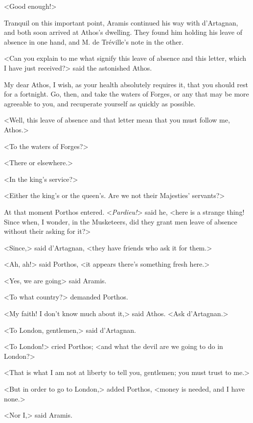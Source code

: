 <Good enough!> 

Tranquil on this important point, Aramis continued his way with d'Artagnan, and both soon arrived at Athos's dwelling. They found him holding his leave of absence in one hand, and M. de Tréville's note in the other. 

<Can you explain to me what signify this leave of absence and this letter, which I have just received?> said the astonished Athos. 

\begin{mail}{}{My dear Athos,}
I wish, as your health absolutely requires it, that you should rest for a fortnight. Go, then, and take the waters of Forges, or any that may be more agreeable to you, and recuperate yourself as quickly as possible. 

\end{mail}

<Well, this leave of absence and that letter mean that you must follow me, Athos.> 

<To the waters of Forges?> 

<There or elsewhere.> 

<In the king's service?> 

<Either the king's or the queen's. Are we not their Majesties' servants?> 

At that moment Porthos entered. <\textit{Pardieu!}> said he, <here is a strange thing! Since when, I wonder, in the Musketeers, did they grant men leave of absence without their asking for it?> 

<Since,> said d'Artagnan, <they have friends who ask it for them.> 

<Ah, ah!> said Porthos, <it appears there's something fresh here.> 

<Yes, we are going\longdash> said Aramis. 

<To what country?> demanded Porthos. 

<My faith! I don't know much about it,> said Athos. <Ask d'Artagnan.> 

<To London, gentlemen,> said d'Artagnan. 

<To London!> cried Porthos; <and what the devil are we going to do in London?> 

<That is what I am not at liberty to tell you, gentlemen; you must trust to me.> 

<But in order to go to London,> added Porthos, <money is needed, and I have none.> 

<Nor I,> said Aramis. 

